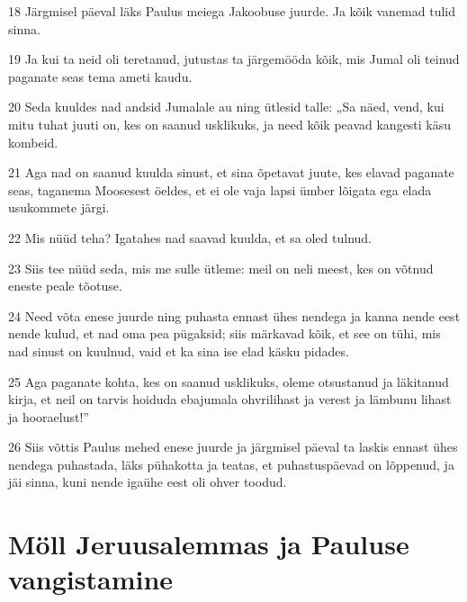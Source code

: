 \par 18 Järgmisel päeval läks Paulus meiega Jakoobuse juurde. Ja kõik vanemad tulid sinna.
\par 19 Ja kui ta neid oli teretanud, jutustas ta järgemööda kõik, mis Jumal oli teinud paganate seas tema ameti kaudu.
\par 20 Seda kuuldes nad andsid Jumalale au ning ütlesid talle: „Sa näed, vend, kui mitu tuhat juuti on, kes on saanud usklikuks, ja need kõik peavad kangesti käsu kombeid.
\par 21 Aga nad on saanud kuulda sinust, et sina õpetavat juute, kes elavad paganate seas, taganema Moosesest öeldes, et ei ole vaja lapsi ümber lõigata ega elada usukommete järgi.
\par 22 Mis nüüd teha? Igatahes nad saavad kuulda, et sa oled tulnud.
\par 23 Siis tee nüüd seda, mis me sulle ütleme: meil on neli meest, kes on võtnud eneste peale tõotuse.
\par 24 Need võta enese juurde ning puhasta ennast ühes nendega ja kanna nende eest nende kulud, et nad oma pea pügaksid; siis märkavad kõik, et see on tühi, mis nad sinust on kuulnud, vaid et ka sina ise elad käsku pidades.
\par 25 Aga paganate kohta, kes on saanud usklikuks, oleme otsustanud ja läkitanud kirja, et neil on tarvis hoiduda ebajumala ohvrilihast ja verest ja lämbunu lihast ja hooraelust!”
\par 26 Siis võttis Paulus mehed enese juurde ja järgmisel päeval ta laskis ennast ühes nendega puhastada, läks pühakotta ja teatas, et puhastuspäevad on lõppenud, ja jäi sinna, kuni nende igaühe eest oli ohver toodud.

\section*{Möll Jeruusalemmas ja Pauluse vangistamine}

